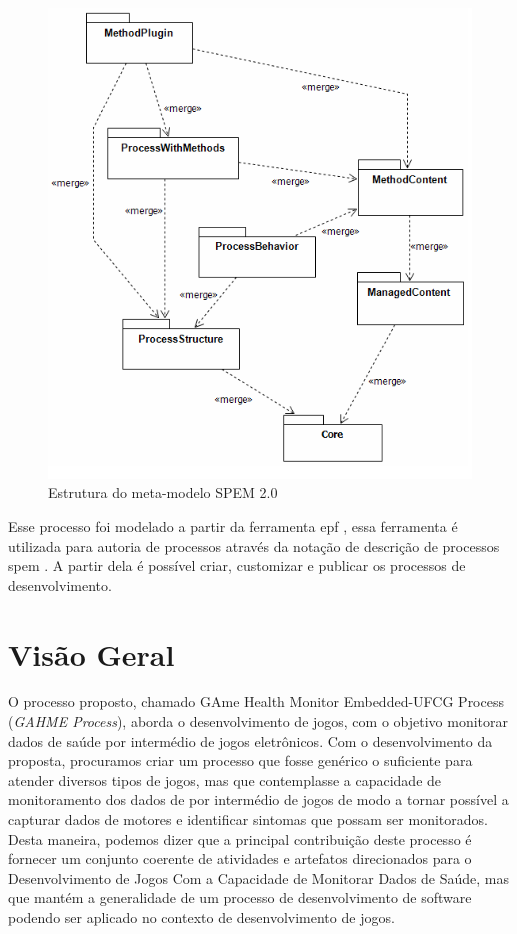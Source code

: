 \begin{figure}
 \centering
 \includegraphics[scale=0.5]{./img/spem20.png}
\caption{Estrutura do meta-modelo SPEM 2.0}
 \label{fig:spem20}
\end{figure}

Esse processo foi modelado a partir da ferramenta \ac{epf} \cite{epf13}, essa ferramenta é utilizada para autoria de processos através da notação de descrição de processos \ac{spem} \cite{spem08}. A partir dela é possível criar, customizar e publicar os processos de desenvolvimento.

\section{Visão Geral}
O processo proposto, chamado GAme Health Monitor Embedded-UFCG Process (\textit{GAHME Process}), aborda o desenvolvimento de jogos, com o objetivo monitorar dados de saúde por intermédio de jogos eletrônicos. Com o desenvolvimento da proposta, procuramos criar um processo que fosse genérico o suficiente para atender diversos tipos de jogos, mas que contemplasse a capacidade de monitoramento dos dados de por intermédio de jogos de modo a tornar possível a capturar dados de motores e identificar sintomas que possam ser monitorados. Desta maneira, podemos dizer que a principal contribuição deste processo é fornecer um conjunto coerente de atividades e artefatos direcionados para o Desenvolvimento de Jogos Com a Capacidade de Monitorar Dados de Saúde, mas que mantém a generalidade de um processo de desenvolvimento de software podendo ser aplicado no contexto de desenvolvimento de jogos.

